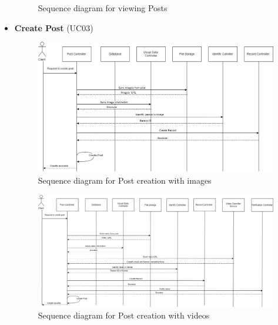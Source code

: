 \begin{itemize}
\begin{center}
\begin{figure}[H]
		\caption{Sequence diagram for viewing Posts}
		\end{figure}
	\end{center}
	\item \textbf{Create Post} (UC03)
	\begin{center}
		\begin{figure}[H]
		\centering
		\includegraphics[width=1\columnwidth]{images/chap4/createpost_sequence.png}
		\caption{Sequence diagram for Post creation with images}
		\end{figure}
	\end{center}
	\begin{center}
		\begin{figure}[H]
		\centering
		\includegraphics[width=1\columnwidth]{images/chap4/createpost_sequence_video.png}
		\caption{Sequence diagram for Post creation with videos}
		\end{figure}
	\end{center}

\end{itemize}



